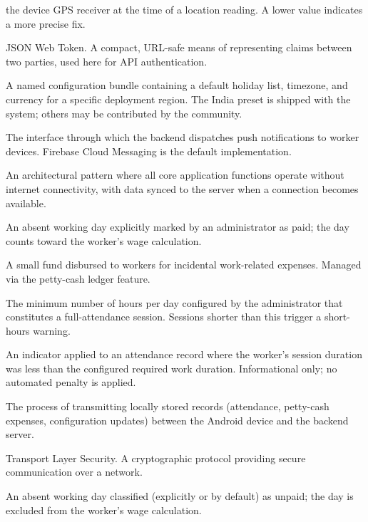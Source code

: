 \documentclass[12pt, a4paper]{article}
\begin{document}
\begin{description}[leftmargin=4cm, style=nextline]
        the device GPS receiver at the time of a location reading.
        A lower value indicates a more precise fix.
    \item[JWT]
        JSON Web Token. A compact, URL-safe means of representing claims
        between two parties, used here for API authentication.
    \item[Locale Preset]
        A named configuration bundle containing a default holiday list,
        timezone, and currency for a specific deployment region.
        The India preset is shipped with the system; others may be
        contributed by the community.
    \item[NotificationProvider]
        The interface through which the backend dispatches push
        notifications to worker devices. Firebase Cloud Messaging is
        the default implementation.
    \item[Offline-First]
        An architectural pattern where all core application functions
        operate without internet connectivity, with data synced to the
        server when a connection becomes available.
    \item[Paid Leave]
        An absent working day explicitly marked by an administrator as
        paid; the day counts toward the worker's wage calculation.
    \item[Petty Cash]
        A small fund disbursed to workers for incidental work-related
        expenses. Managed via the petty-cash ledger feature.
    \item[Required Work Duration]
        The minimum number of hours per day configured by the
        administrator that constitutes a full-attendance session.
        Sessions shorter than this trigger a short-hours warning.
    \item[Short-Hours Flag]
        An indicator applied to an attendance record where the worker's
        session duration was less than the configured required work
        duration. Informational only; no automated penalty is applied.
    \item[Sync]
        The process of transmitting locally stored records (attendance,
        petty-cash expenses, configuration updates) between the Android
        device and the backend server.
    \item[TLS]
        Transport Layer Security. A cryptographic protocol providing
        secure communication over a network.
    \item[Unpaid Leave]
        An absent working day classified (explicitly or by default) as
        unpaid; the day is excluded from the worker's wage calculation.

\end{description}
\end{document}
